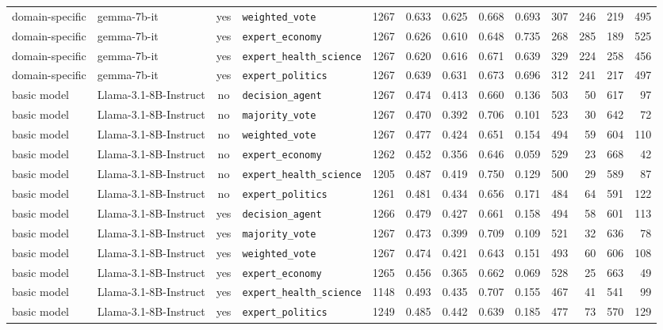 \begin{landscape}
\begin{longtable}{@{}l p{3.2cm} c l r r r r r r r r r@{}}
domain-specific & gemma-7b-it & yes & \texttt{weighted\_vote} & 1267 & 0.633 & 0.625 & 0.668 & 0.693 & 307 & 246 & 219 & 495\\
domain-specific & gemma-7b-it & yes & \texttt{expert\_economy} & 1267 & 0.626 & 0.610 & 0.648 & 0.735 & 268 & 285 & 189 & 525\\
domain-specific & gemma-7b-it & yes & \texttt{expert\_health\_science} & 1267 & 0.620 & 0.616 & 0.671 & 0.639 & 329 & 224 & 258 & 456\\
domain-specific & gemma-7b-it & yes & \texttt{expert\_politics} & 1267 & 0.639 & 0.631 & 0.673 & 0.696 & 312 & 241 & 217 & 497\\
\midrule
basic model & Llama-3.1-8B-Instruct & no & \texttt{decision\_agent} & 1267 & 0.474 & 0.413 & 0.660 & 0.136 & 503 & 50 & 617 & 97\\
basic model & Llama-3.1-8B-Instruct & no & \texttt{majority\_vote} & 1267 & 0.470 & 0.392 & 0.706 & 0.101 & 523 & 30 & 642 & 72\\
basic model & Llama-3.1-8B-Instruct & no & \texttt{weighted\_vote} & 1267 & 0.477 & 0.424 & 0.651 & 0.154 & 494 & 59 & 604 & 110\\
basic model & Llama-3.1-8B-Instruct & no & \texttt{expert\_economy} & 1262 & 0.452 & 0.356 & 0.646 & 0.059 & 529 & 23 & 668 & 42\\
basic model & Llama-3.1-8B-Instruct & no & \texttt{expert\_health\_science} & 1205 & 0.487 & 0.419 & 0.750 & 0.129 & 500 & 29 & 589 & 87\\
basic model & Llama-3.1-8B-Instruct & no & \texttt{expert\_politics} & 1261 & 0.481 & 0.434 & 0.656 & 0.171 & 484 & 64 & 591 & 122\\
basic model & Llama-3.1-8B-Instruct & yes & \texttt{decision\_agent} & 1266 & 0.479 & 0.427 & 0.661 & 0.158 & 494 & 58 & 601 & 113\\
basic model & Llama-3.1-8B-Instruct & yes & \texttt{majority\_vote} & 1267 & 0.473 & 0.399 & 0.709 & 0.109 & 521 & 32 & 636 & 78\\
basic model & Llama-3.1-8B-Instruct & yes & \texttt{weighted\_vote} & 1267 & 0.474 & 0.421 & 0.643 & 0.151 & 493 & 60 & 606 & 108\\
basic model & Llama-3.1-8B-Instruct & yes & \texttt{expert\_economy} & 1265 & 0.456 & 0.365 & 0.662 & 0.069 & 528 & 25 & 663 & 49\\
basic model & Llama-3.1-8B-Instruct & yes & \texttt{expert\_health\_science} & 1148 & 0.493 & 0.435 & 0.707 & 0.155 & 467 & 41 & 541 & 99\\
basic model & Llama-3.1-8B-Instruct & yes & \texttt{expert\_politics} & 1249 & 0.485 & 0.442 & 0.639 & 0.185 & 477 & 73 & 570 & 129\\

\end{longtable}
\end{landscape}

